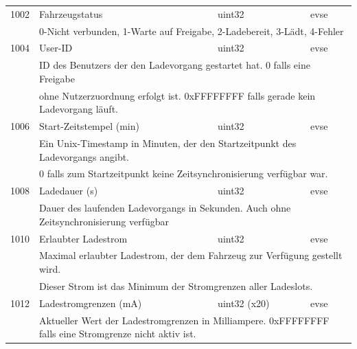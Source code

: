 \documentclass[a4paper,10pt]{article}
\newcommand{\tdesc}[1]{\multicolumn{3}{l}{\footnotesize #1}}
\begin{document}
\begin{tabularx}{\textwidth}{rXll}
1002          & Fahrzeugstatus                          & uint32       & evse                                                   \\
              & \tdesc{0-Nicht verbunden, 1-Warte auf Freigabe, 2-Ladebereit, 3-Lädt, 4-Fehler}                                 \\ \cmidrule{2-4}
1004          & User-ID                                 & uint32       & evse                                                   \\
              & \tdesc{ID des Benutzers der den Ladevorgang gestartet hat. 0 falls eine Freigabe}                               \\
              & \tdesc{ohne Nutzerzuordnung erfolgt ist. 0xFFFFFFFF falls gerade kein Ladevorgang läuft.}                       \\ \cmidrule{2-4}
1006          & Start-Zeitstempel (min)                 & uint32       & evse                                                   \\
              & \tdesc{Ein Unix-Timestamp in Minuten, der den Startzeitpunkt des Ladevorgangs angibt.}                          \\
              & \tdesc{0 falls zum Startzeitpunkt keine Zeitsynchronisierung verfügbar war.}                                    \\ \cmidrule{2-4}
1008          & Ladedauer (s)                           & uint32       & evse                                                   \\
              & \tdesc{Dauer des laufenden Ladevorgangs in Sekunden. Auch ohne Zeitsynchronisierung verfügbar}                  \\ \cmidrule{2-4}
1010          & Erlaubter Ladestrom                     & uint32       & evse                                                   \\
              & \tdesc{Maximal erlaubter Ladestrom, der dem Fahrzeug zur Verfügung gestellt wird.}                              \\
              & \tdesc{Dieser Strom ist das Minimum der Stromgrenzen aller Ladeslots.}                                          \\ \cmidrule{2-4}
1012          & Ladestromgrenzen (mA)                   & uint32 (x20) & evse                                                   \\
              & \tdesc{Aktueller Wert der Ladestromgrenzen in Milliampere. 0xFFFFFFFF falls eine Stromgrenze nicht aktiv ist.}  \\

\end{tabularx}
\end{document}
